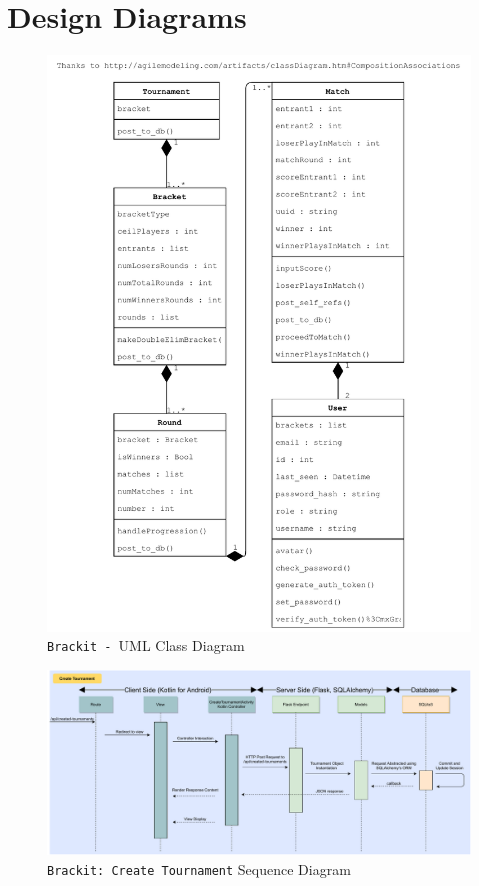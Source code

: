 \documentclass{article}
\begin{document}
\section{Design Diagrams}
\begin{center}
    \begin{figure}[htp]
        \centering
        \includegraphics[width=13cm]{../diagrams/uml_class_tourn.pdf}
        \caption{\texttt{Brackit - }UML Class Diagram}
        \end{figure}
\end{center}

\begin{center}
    \begin{figure}[htp]
        \centering
        \includegraphics[width=16cm]{../diagrams/sequence.pdf}
        \caption{\texttt{Brackit: Create Tournament} Sequence Diagram}
        \end{figure}
\end{center}




\clearpage


\end{document}
